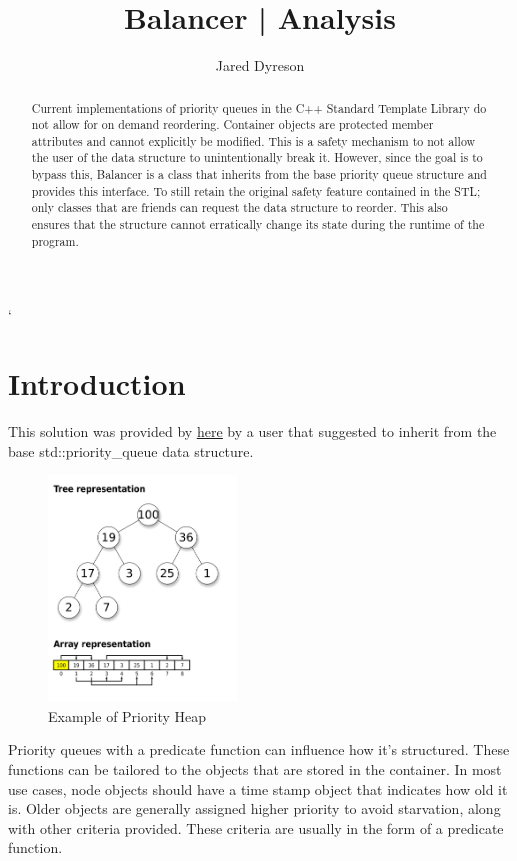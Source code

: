 \documentclass{article}
\title{Balancer | Analysis}
\author{Jared Dyreson}
\begin{document}
\lstMakeShortInline`

\maketitle
\tableofcontents

\newpage

\begin{abstract}
Current implementations of priority queues in the C++ Standard Template Library do not allow for on demand reordering.
Container objects are protected member attributes and cannot explicitly be modified.
This is a safety mechanism to not allow the user of the data structure to unintentionally break it.
However, since the goal is to bypass this, Balancer is a class that inherits from the base priority queue structure and provides this interface.
To still retain the original safety feature contained in the STL; only classes that are friends can request the data structure to reorder.
This also ensures that the structure cannot erratically change its state during the runtime of the program.
\end{abstract}

\section{Introduction}

\begin{flushleft}

This solution was provided by \href{https://stackoverflow.com/questions/5810190/how-to-tell-a-stdpriority-queue-to-refresh-its-ordering}{\underline{here}} by a user that suggested to inherit from the base std::priority_queue data structure.

\begin{figure}[!h]
\centering
\includegraphics[width=5cm]{Max-Heap}
\caption{Example of Priority Heap}
\end{figure}

Priority queues with a predicate function can influence how it's structured.
These functions can be tailored to the objects that are stored in the container.
In most use cases, node objects should have a time stamp object that indicates how old it is.
Older objects are generally assigned higher priority to avoid starvation, along with other criteria provided.
These criteria are usually in the form of a predicate function.
\end{flushleft}
\end{document}
